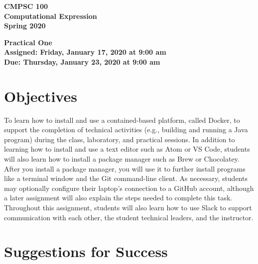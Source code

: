 \documentclass[11pt]{article}
\newcommand{\assignmentduedate}{January 23}
\newcommand{\assignmentassignedate}{January 17}
\newcommand{\assignmentnumber}{One}
\newcommand{\labyear}{2020}
\newcommand{\labdueday}{Thursday}
\newcommand{\labassignday}{Friday}
\newcommand{\labtime}{9:00 am}
\newcommand{\assigneddate}{Assigned: \labassignday, \assignmentassignedate, \labyear{} at \labtime{}}
\newcommand{\duedate}{Due: \labdueday, \assignmentduedate, \labyear{} at \labtime{}}
\newcommand{\labtitle}[1]
{
  \begin{center}
    \begin{center}
      \bf
      CMPSC 100\\Computational Expression\\
      Spring 2020\\
      \medskip
    \end{center}
    \bf
    #1
  \end{center}
}
\begin{document}
\thispagestyle{empty}

\labtitle{Practical \assignmentnumber{} \\ \assigneddate{} \\ \duedate{}}



\section*{Objectives}

To learn how to install and use a contained-based platform, called Docker, to
support the completion of technical activities (e.g., building and running a
Java program) during the class, laboratory, and practical sessions. In addition
to learning how to install and use a text editor such as Atom or VS Code,
students will also learn how to install a package manager such as Brew or
Chocolatey. After you install a package manager, you will use it to further
install programs like a terminal window and the Git command-line client. As
necessary, students may optionally configure their laptop's connection to a
GitHub account, although a later assignment will also explain the steps needed
to complete this task. Throughout this assignment, students will also learn how
to use Slack to support communication with each other, the student technical
leaders, and the instructor.

\section*{Suggestions for Success}
\end{document}
